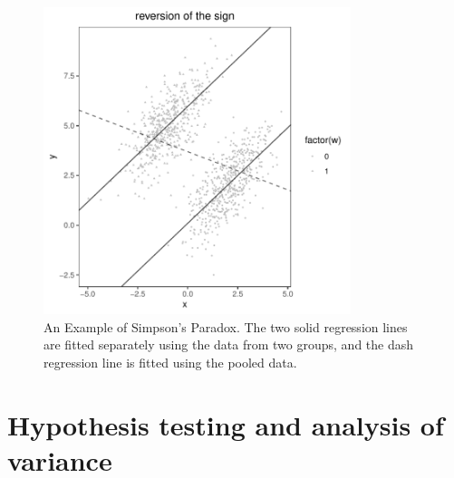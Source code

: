 \begin{figure}[ht]
\centering
\includegraphics[width = 0.8\textwidth]{figures/simpsonparadoxexample_ggplot.pdf}
\caption{An Example of Simpson's Paradox. The two solid regression lines are fitted separately using the data from two groups, and the dash regression line is fitted using the pooled data. }\label{fig::simpsonparadoxexample}
\end{figure}
 
 

\section{Hypothesis testing and analysis of variance}\label{sec::fwl-anova}

